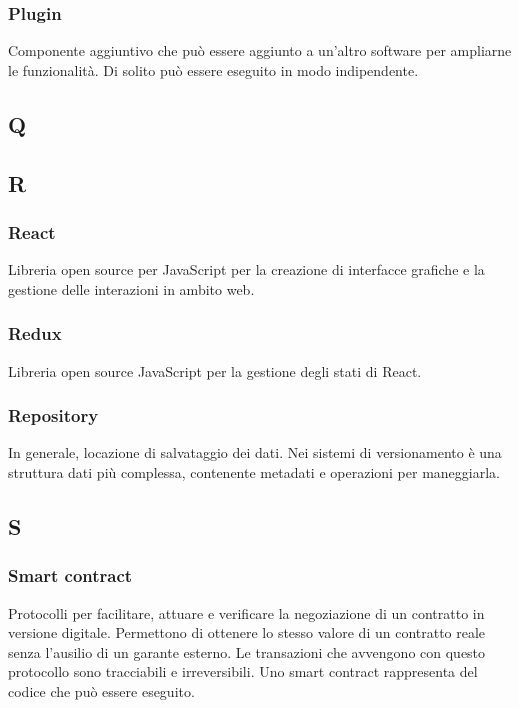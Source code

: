 \subsubsection*{Plugin}
Componente aggiuntivo che può essere aggiunto a un'altro software per ampliarne le funzionalità. Di solito può essere eseguito in modo indipendente.



\subsection*{Q}

\subsection*{R}

\subsubsection*{React}
Libreria open source per JavaScript per la creazione di interfacce grafiche e la gestione delle interazioni in ambito web.

\subsubsection*{Redux}
Libreria open source JavaScript per la gestione degli stati di React\glo.

\subsubsection*{Repository}
In generale, locazione di salvataggio dei dati. Nei sistemi di versionamento è una struttura dati più complessa, contenente metadati e operazioni per maneggiarla.


\subsection*{S}



\subsubsection*{Smart contract}
Protocolli per facilitare, attuare e verificare la negoziazione di un contratto in versione digitale. Permettono di ottenere lo stesso valore di un contratto reale senza l'ausilio di un garante esterno. Le transazioni che avvengono con questo protocollo sono tracciabili e irreversibili. Uno smart contract rappresenta del codice che può essere eseguito.

